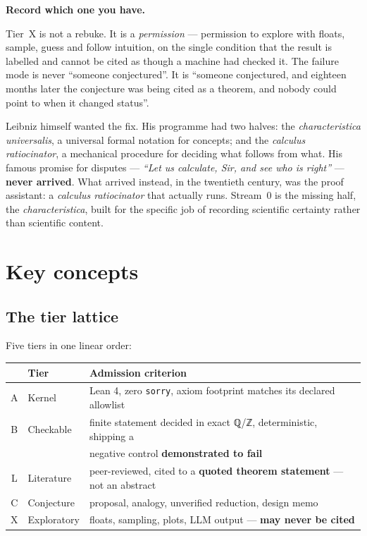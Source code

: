\documentclass[11pt,a4paper]{article}
\begin{document}
\begin{center}\large\bfseries Record which one you have.\end{center}

Tier~X is not a rebuke. It is a \emph{permission} — permission to explore with floats, sample,
guess and follow intuition, on the single condition that the result is labelled and cannot be
cited as though a machine had checked it. The failure mode is never ``someone conjectured''. It
is ``someone conjectured, and eighteen months later the conjecture was being cited as a theorem,
and nobody could point to when it changed status''.

Leibniz himself wanted the fix. His programme had two halves: the \emph{characteristica
universalis}, a universal formal notation for concepts; and the \emph{calculus ratiocinator}, a
mechanical procedure for deciding what follows from what. His famous promise for disputes —
\emph{``Let us calculate, Sir, and see who is right''} — \textbf{never arrived}. What arrived
instead, in the twentieth century, was the proof assistant: a \emph{calculus ratiocinator} that
actually runs. Stream~0 is the missing half, the \emph{characteristica}, built for the specific
job of recording scientific certainty rather than scientific content.

\section{Key concepts}

\subsection{The tier lattice}

Five tiers in one linear order:

\begin{center}\small
\begin{tabular}{@{}cll@{}}
\toprule
& Tier & Admission criterion \\
\midrule
\textsf{A} & Kernel      & Lean 4, zero \texttt{sorry}, axiom footprint matches its declared allowlist \\
\textsf{B} & Checkable   & finite statement decided in exact ℚ/ℤ, deterministic, shipping a \\
           &             & negative control \textbf{demonstrated to fail} \\
\textsf{L} & Literature  & peer-reviewed, cited to a \textbf{quoted theorem statement} — not an abstract \\
\textsf{C} & Conjecture  & proposal, analogy, unverified reduction, design memo \\
\textsf{X} & Exploratory & floats, sampling, plots, LLM output — \textbf{may never be cited} \\
\bottomrule
\end{tabular}
\end{center}
\end{document}
